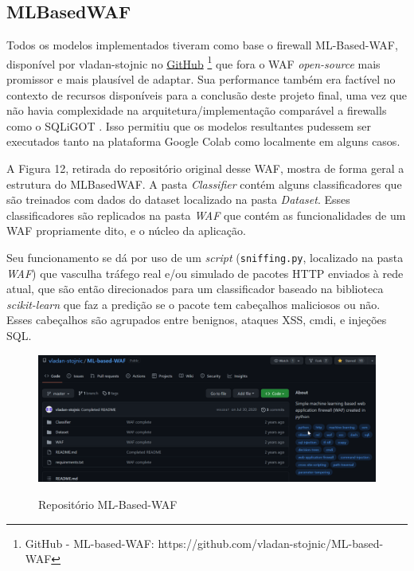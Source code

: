 \subsection{MLBasedWAF}
Todos os modelos implementados tiveram como base o firewall ML-Based-WAF, disponível por vladan-stojnic no \href{https://github.com/vladan-stojnic/ML-based-WAF}{GitHub} \footnote{GitHub - ML-based-WAF: https://github.com/vladan-stojnic/ML-based-WAF} \cite{ml_based_waf} que fora o WAF \textit{open-source} mais promissor e mais plausível de adaptar. Sua performance também era factível no contexto de recursos disponíveis para a conclusão deste projeto final, uma vez que não havia complexidade na arquitetura/implementação comparável a firewalls como o SQLiGOT \cite{kar2016sqligot}. Isso permitiu que os modelos resultantes pudessem ser executados tanto na plataforma Google Colab como localmente em alguns casos.

A Figura 12, retirada do repositório original desse WAF, mostra de forma geral a estrutura do MLBasedWAF. A pasta \textit{Classifier} contém alguns classificadores que são treinados com dados do dataset localizado na pasta \textit{Dataset}. Esses classificadores são replicados na pasta \textit{WAF} que contém as funcionalidades de um WAF propriamente dito, e o núcleo da aplicação.

Seu funcionamento se dá por uso de um \textit{script} (\verb+sniffing.py+, localizado na pasta \textit{WAF}) que vasculha tráfego real e/ou simulado de pacotes HTTP enviados à rede atual, que são então direcionados para um classificador baseado na biblioteca \textit{scikit-learn} que faz a predição se o pacote tem cabeçalhos maliciosos ou não. Esses cabeçalhos são agrupados entre benignos, ataques XSS, cmdi, e injeções SQL.

\begin{figure}[ht]
    \centering
    \caption{Repositório ML-Based-WAF}
    \includegraphics[width=16cm]{figuras/MLBasedWAF.png} 
    \label{fig:internet} 
\end{figure}

